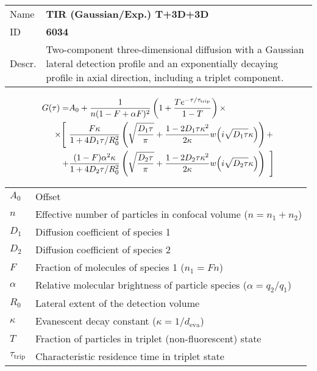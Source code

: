 \noindent \begin{tabular}{lp{}}
Name & \textbf{TIR (Gaussian/Exp.) T+3D+3D} \\ 
ID & \textbf{6034} \\ 
Descr. &  Two-component three-dimensional diffusion with a Gaussian lateral detection profile and an exponentially decaying profile in axial direction, including a triplet component\cite{Starr2001, Hassler2005, Ohsugi2006}. \\
\end{tabular}
\begin{align}
G(\tau) = &A_0 + \frac{1}{n (1-F + \alpha F)^2} \left(1 + \frac{T e^{-\tau/\tau_\mathrm{trip}}}{1-T}  \right)  \times \\
\notag \times  \Bigg[ \,\, & 
\frac{F \kappa}{1+ 4 D_1 \tau/R_0^2} 
\left( \sqrt{\frac{D_1 \tau}{\pi}} + \frac{1 - 2 D_1 \tau \kappa^2}{2 \kappa}  w\!\left(i \sqrt{D_1 \tau} \kappa\right) \right) + \\
 \notag + &
\frac{(1-F) \alpha^2 \kappa}{1+ 4 D_2 \tau/R_0^2} 
\left( \sqrt{\frac{D_2 \tau}{\pi}} + \frac{1 - 2 D_2 \tau \kappa^2}{2 \kappa}  w\!\left(i \sqrt{D_2 \tau} \kappa\right) \right) \,\, \Bigg]
\end{align} 
\begin{center}
\begin{tabular}{ll}
$A_0$ & Offset \\ 
$n$ & Effective number of particles in confocal volume ($n = n_1+n_2$) \\ 
$D_1$ &  Diffusion coefficient of species 1 \\ 
$D_2$ &  Diffusion coefficient of species 2 \\ 
$F$ & Fraction of molecules of species 1 ($n_1 = F n$) \\
$\alpha$ & Relative molecular brightness of particle species ($ \alpha = q_2/q_1$) \\
$R_0$ & Lateral extent of the detection volume \\
$\kappa$ &  Evanescent decay constant ($\kappa = 1/d_\mathrm{eva}$)\\ 
$T$ &  Fraction of particles in triplet (non-fluorescent) state\\ 
$\tau_\mathrm{trip}$ &  Characteristic residence time in triplet state \\ 
\end{tabular}
\end{center}
\vspace{2em}




